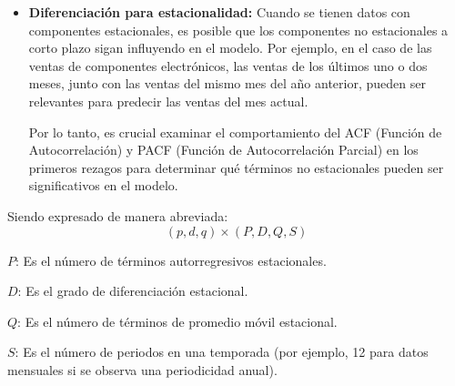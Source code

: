 \begin{itemize}
    \item \textbf{Diferenciación para estacionalidad:} Cuando se tienen datos con componentes estacionales, es posible que los componentes no estacionales a corto plazo sigan influyendo en el modelo. Por ejemplo, en el caso de las ventas de componentes electrónicos, las ventas de los últimos uno o dos meses, junto con las ventas del mismo mes del año anterior, pueden ser relevantes para predecir las ventas del mes actual.

    Por lo tanto, es crucial examinar el comportamiento del ACF (Función de Autocorrelación) y PACF (Función de Autocorrelación Parcial) en los primeros rezagos para determinar qué términos no estacionales pueden ser significativos en el modelo.
        
\end{itemize}

Siendo expresado de manera abreviada: 
\begin{equation*}
    (p,d,q) \times (P, D, Q, S)
\end{equation*}

\( P \): Es el número de términos autorregresivos estacionales.

\( D \): Es el grado de diferenciación estacional.

\( Q \): Es el número de términos de promedio móvil estacional.

\( S \): Es el número de periodos en una temporada (por ejemplo, 12 para datos mensuales si se observa una periodicidad anual).

